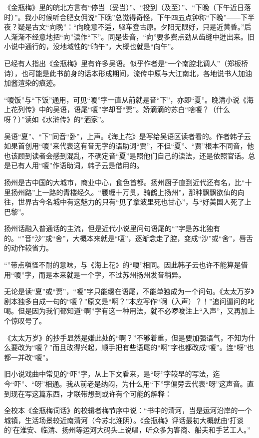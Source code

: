\par 《金瓶梅》里的皖北方言有“停当（妥当）”、“投到（及至）”、“下晚（下午近日落时）”。我小时候听合肥女佣说“下晚”总觉得奇怪，下午四五点钟称“下晚”——下半夜？疑是古文“向晚”：“向晚意不适，驱车登古原。夕阳无限好，只是近黄昏。”后人渐渐不经意地把“向”读作“下”。同是齿音，“向”要多费点劲从齿缝中迸出来。旧小说中通行的，没地域性的“晌午”，大概也就是“向午”。
\par 已经有人指出《金瓶梅》里有许多吴语。似乎作者是“一个南腔北调人”（郑板桥诗），也可能是此书前身的话本形成期间，流传中原与大江南北，各地说书人加油加酱渲染的痕迹。
\par “嗄饭”与“下饭”通用，可见“嗄”字一直从前就是音“下”，亦即“夏”。晚清小说《海上花列传》中的吴语，语尾“嗄”字却音“贾”。娇滴滴的苏白“啥嗄？（什么呀？）”读如《水浒传》的“洒家”。
\par 吴语“夏”、“下”同音“卧”，上声。《海上花》是写给吴语区读者看的。作者韩子云如果首创用“嗄”来代表这有音无字的语助词“贾”，不但“夏”、“贾”根本不同音，他也该顾到读者会感到混乱，不确定音“夏”是照他们自己的读法，还是依照官话。总是已有人用“嗄”作语助词，韩子云是借用的。
\par 扬州是古中国的大城市，商业中心，食色首都。扬州厨子直到近代还有名，比“十里扬州路”上一路的青楼经久。“腰缠十万贯，骑鹤上扬州”，那种飘飘欲仙的向往，世界古今名城中有这魅力的只有“见了拿波里死也甘心”，与“好美国人死了上巴黎”。
\par 扬州话融入普通话的主流，但是近代小说里问句语尾的“”字是苏北独有的。“”音“沙”或“舍”，大概本来就是“嗄”，逐渐念走了腔，变成“沙”或“舍”，唇舌的动作较省力。
\par “”带点嗔怪不耐的意味，与《海上花》的“嗄”相同。因此韩子云也许不能算是借用“嗄”字，而是本来就是一个字，不过苏州扬州发音稍异。
\par 无论是读“夏”或“贾”，“嗄”字只能缀在语尾，不能单独成为一个问句。《太太万岁》剧本独多自成一句的“嗄？”原文是“啊？”本应写作“啊（入声）？！”追问逼问的叱喝。但是因为我们都知道“啊”字有这一种用法，就不必啰唆注上“入声”，又再加上个惊叹号了。
\par 《太太万岁》的抄手显然是嫌此处的“啊？”不够着重，但是要加强语气，不知为什么要改为“嗄？”而且改得兴起，顺手把有些语尾的“啊”字也都改成“嗄”。连“呀”也都一并改“嗄”。
\par 旧小说戏曲中常见的“吓”字，从上下文看来，是“呀”字较早的写法，迄今“吓”、“呀”相通。我从前老是纳闷，为什么用“下”字偏旁去代表“呀”这声音。直到现在写这篇东西，才联带想到或许有个可能的解释：
\par 全校本《金瓶梅词话》的校辑者梅节序中说：“书中的清河，当是运河沿岸的一个城镇，生活场景较近南清河（今苏北淮阴）。《金瓶梅》评话最初大概就由‘打谈的’在淮安、临清、扬州等运河大码头上说唱，听众多为客商、船夫和手艺工人。”
